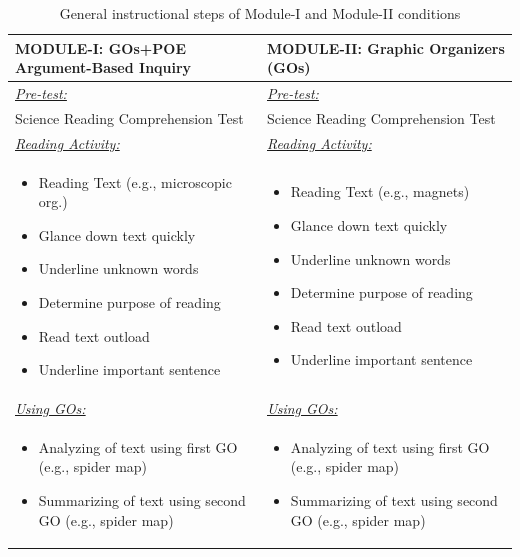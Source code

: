 \documentclass[11.5pt]{sig-alternate} %
\begin{document}
\begin{large}
\begin{table}[th]
\caption{General instructional steps of Module-I and Module-II conditions}
\begin{tabular}{ll}
\hline
\textbf{MODULE-I:} GOs+POE Argument-Based Inquiry & \textbf{MODULE-II:} Graphic Organizers (GOs) \\ \hline
\underline{\textit{Pre-test:}} & \underline{\textit{Pre-test:}} \\
Science Reading Comprehension Test & Science Reading Comprehension Test \\
\underline{\textit{Reading Activity:}} & \underline{\textit{Reading Activity:}} \\
\begin{itemize}[noitemsep, topsep=0pt]
    \item Reading Text (e.g., microscopic org.)
    \item Glance down text quickly
    \item Underline unknown words
    \item Determine purpose of reading 
    \item Read text outload
    \item Underline important sentence
\end{itemize} &
\begin{itemize}[noitemsep, topsep=0pt]
    \item Reading Text (e.g., magnets)
    \item Glance down text quickly
    \item Underline unknown words
    \item Determine purpose of reading 
    \item Read text outload
    \item Underline important sentence
\end{itemize} \\
\underline{\textit{Using GOs:}} & \underline{\textit{Using GOs:}} \\
\begin{itemize}[noitemsep, topsep=0pt]
    \item Analyzing of text using first GO (e.g., spider map)
    \item Summarizing of text using second GO (e.g., spider map)
\end{itemize} &
\begin{itemize}[noitemsep, topsep=0pt]
    \item Analyzing of text using first GO (e.g., spider map)
    \item Summarizing of text using second GO (e.g., spider map)

\end{itemize}
\end{tabular}
\end{table}
\end{large}
\end{document}
